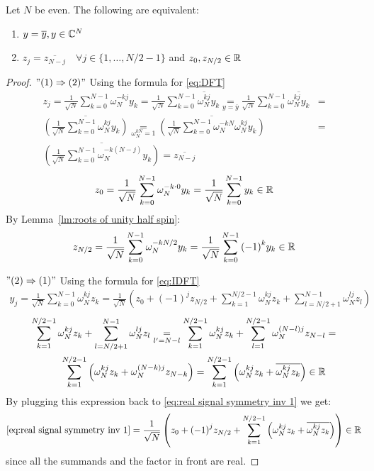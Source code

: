 \begin{theorem} \label{thm:real signal symmetry}
	Let $N$ be even. The following are equivalent:

	\begin{enumerate}
		\item $y = \overline{y}, y\in \mathbb{C}^N$
		\item $z_{j} = \overline{z_{N-j}} \quad \forall j \in \{1, \dots, N/2-1\}$ and $z_0, z_{N/2} \in \mathbb{R}$
	\end{enumerate}
\end{theorem}
\begin{proof} \hfill \break
	$"(1)\Rightarrow (2)"$ Using the formula for \ref{eq:DFT}
	\[\begin{aligned}
			z_j
			= \frac{1}{\sqrt N} \sum_{k=0}^{N-1} \omega_N^{-kj}y_k
			= \frac{1}{\sqrt N} \sum_{k=0}^{N-1} \overline{\omega_N^{kj}} y_k
			\underset{y=\overline{y}}{=} \frac{1}{\sqrt N} \sum_{k=0}^{N-1} \overline{\omega_N^{kj}y_k}
			 & = \\ \overline{ \left(\frac{1}{\sqrt N} \sum_{k=0}^{N-1} \omega_N^{kj} y_k \right)}
			\underset{\omega_N^{kN}=1}{=} \overline{ \left(\frac{1}{\sqrt N} \sum_{k=0}^{N-1} \omega_N^{-kN}\omega_N^{kj} y_k \right)}
			 & = \\ \overline{ \left(\frac{1}{\sqrt N} \sum_{k=0}^{N-1} \omega_N^{-k(N-j)} y_k \right)}
			= \overline{z_{N-j}}
		\end{aligned}\]
	\[z_0
		= \frac{1}{\sqrt N} \sum_{k=0}^{N-1} \omega_N^{-k\cdot 0}y_k
		= \frac{1}{\sqrt N} \sum_{k=0}^{N-1} y_k \in \mathbb{R}\]
	By Lemma~\ref{lm:roots of unity half spin}:
	\[z_{N/2}
		= \frac{1}{\sqrt N} \sum_{k=0}^{N-1} \omega_N^{-k N/2}y_k
		= \frac{1}{\sqrt N} \sum_{k=0}^{N-1} {(-1)}^k y_k \in \mathbb{R}\]

	\noindent $"(2)\Rightarrow (1)"$ Using the formula for \ref{eq:IDFT}
	\begin{equation}
		\begin{aligned}
			y_j
			= \frac{1}{\sqrt{N}}\sum_{k =0}^{N-1} \omega_N^{kj} z_k
			= \frac{1}{\sqrt{N}} \left(z_0 + {(-1)}^jz_{N/2} + \sum_{k = 1}^{N/2-1} \omega_N^{kj} z_k + \sum_{l = N/2+1}^{N-1} \omega_N^{lj} z_l\right)
		\end{aligned} \label{eq:real signal symmetry inv 1}
	\end{equation}
	\[\begin{aligned}
			\sum_{k = 1}^{N/2-1} \omega_N^{kj} z_k + \sum_{l = N/2+1}^{N-1} \omega_N^{lj} z_l
			\underset{l'=N-l}{=} \sum_{k = 1}^{N/2-1} \omega_N^{kj} z_k + \sum_{l = 1}^{N/2-1} \omega_N^{(N-l)j} z_{N-l}
			 & = \\ \sum_{k = 1}^{N/2-1} \left(\omega_N^{kj} z_k + \omega_N^{(N-k)j} z_{N-k}\right)
			= \sum_{k = 1}^{N/2-1} \left(\omega_N^{kj} z_k + \overline{\omega_N^{kj}z_k}\right) \in \mathbb{R}
		\end{aligned}\]
	By plugging this expression back to \eqref{eq:real signal symmetry inv 1} we get:
	\[\eqref{eq:real signal symmetry inv 1}
		= \frac{1}{\sqrt{N}} \left(z_0 + {(-1)}^jz_{N/2} + \sum_{k = 1}^{N/2-1} \left(\omega_N^{kj} z_k + \overline{\omega_N^{kj}z_k}\right)\right) \in \mathbb{R}\]
	since all the summands and the factor in front are real.
\end{proof}